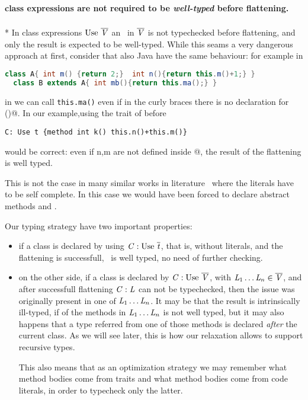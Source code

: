 \paragraph*{class expressions are not required to be \emph{well-typed} before flattening.}${}_{}$\\*
In class expressions  $\use\ \overline\mV$
an \mL\ in $\overline{\mathit{V}}$ is not typechecked before flattening, and only the result is expected to be well-typed.
While this seams a very dangerous approach at first, consider that also Java have the same behaviour:
for example in
\begin{lstlisting}[language=Java]
  class A{ int m() {return 2;}  int n(){return this.m()+1;} }
  class B extends A{ int mb(){return this.ma();} }
\end{lstlisting}

\noindent in \Q@B@ we can call \lstinline{this.ma()} even if in the curly braces there is no declaration for \Q@ma()@.
In our example,using the trait \Q@t@ of before

\begin{lstlisting}
C: Use t {method int k() this.n()+this.m()}
\end{lstlisting}
\noindent would be correct: even if n,m are not defined inside
@,
the result of the flattening is well typed.

This is not the case in many similar works in literature~\cite{} where the
literals have to be self complete. In this case we would have been forced to
declare abstract methods \Q@n@ and \Q@m@.

Our typing strategy have two important properties:
\begin{itemize}
\item if a class is declared by using $\mC : \use\ \overline\mt$, that is, without literals,
and the flattening is successfull, \mC\ is well typed, no need of further checking.
\item on the other side, if a class is declared by $\mC : \use\ \overline\mV$, with
$\mathit{L}_1\ldots\mathit{L}_n \in \overline{\mathit{V}}$, and after successfull flattening $\mathit{C} : \mathit{L}$ can not be typechecked,
then the issue was originally present in one of $\mathit{L}_1\ldots\mathit{L}_n$.
It may be that the result is intrinsically ill-typed, if of the methods in $\mathit{L}_1\ldots\mathit{L}_n$ is not well typed,
but it may also happens that a type referred from one of those methods is declared \emph{after} the current class. As we will see later, this is how our relaxation allows to support recursive types.

This also means that as an optimization strategy
 we may remember what method bodies come from traits and what method bodies come from code literals, in order to typecheck only the latter.
 \end{itemize}

